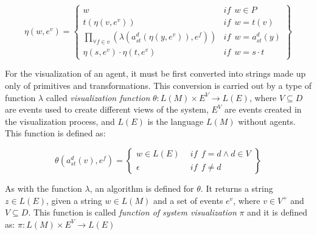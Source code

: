 \documentclass[runningheads]{llncs}
\begin{document}
\begin{small}
\begin{equation}
    \eta (w, e^v) = \left\{
    \begin{array}{ll}
        w   & \mathit{if}  \ \ w \in P  \\

        t(\eta (v, e^v))    & \mathit{if}  \ \  w = t(v)  \\

        \underset{\forall f \in v}{ \prod }(\lambda (a_{st}^d (\eta
            (y, e^v)), e^f))    & \mathit{if}  \ \ w = a_{st}^d(y) \\

        \eta (s, e^v) \cdot \eta (t, e^v)   & \mathit{if}  \
\  w = s \cdot t
    \end{array}\right\}
\end{equation}
\end{small}

For the visualization of an agent, it must be first converted into strings made up only
of primitives and transformations. This conversion is carried out by a type of function $\lambda$
called \textit{visualization function} $\theta: L(M) \times E^V \rightarrow L(E)$, where
$V \subseteq D$ are events used to create different views of the system, $E^V$ are events
created in the visualization process, and $L(E)$
is the language $L(M)$ without agents. This function is defined as:

\begin{small}
\begin{equation}
    \theta (a_{st}^d(v), e^f) =
    \left\{
    \begin{array}{ll}
        w \in L(E) & \ \ \mathit{if}  \ \ f = d \wedge d \in V \\
        \epsilon  & \ \ \mathit{if}  \ \ f \neq d
    \end{array}\right\}
\end{equation}
\end{small}

As with the function $\lambda$, an algorithm is defined for $\theta$. It returns a string $z \in
L(E)$, given a string $w \in L(M)$ and a set of events $e^v$, where $v \in V^+$ and $V \subseteq
D$. This function is called \textit{function of system visualization} $\pi$ and it is defined as:
$\pi: L(M) \times E^V \rightarrow L(E)$
\end{document}
